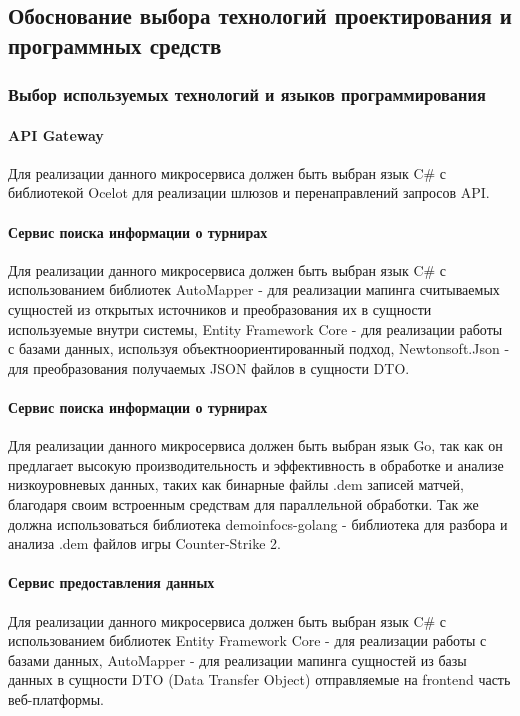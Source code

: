 \subsection{Обоснование выбора технологий проектирования и программных средств}
\subsubsection{Выбор используемых технологий и языков программирования}

\paragraph{API Gateway}

Для реализации данного микросервиса должен быть выбран язык C\# с библиотекой Ocelot для реализации шлюзов и перенаправлений запросов API.

\paragraph{Сервис поиска информации о турнирах}

Для реализации данного микросервиса должен быть выбран язык C\# с использованием библиотек AutoMapper - для реализации мапинга считываемых сущностей из открытых источников и преобразования их в сущности используемые внутри системы, Entity Framework Core - для реализации работы с базами данных, используя объектноориентированный подход, Newtonsoft.Json - для преобразования получаемых JSON файлов в сущности DTO.

\paragraph{Сервис поиска информации о турнирах}

Для реализации данного микросервиса должен быть выбран язык Go, так как он предлагает высокую производительность и эффективность в обработке и анализе низкоуровневых данных, таких как  бинарные файлы .dem записей матчей, благодаря своим встроенным средствам для параллельной обработки. Так же должна использоваться библиотека demoinfocs-golang - библиотека для разбора и анализа .dem файлов игры Counter-Strike 2.

\paragraph{Сервис предоставления данных}

Для реализации данного микросервиса должен быть выбран язык C\# с использованием библиотек Entity Framework Core - для реализации работы с базами данных, AutoMapper - для реализации мапинга сущностей из базы данных в сущности DTO (Data Transfer Object) отправляемые на frontend часть веб-платформы.

